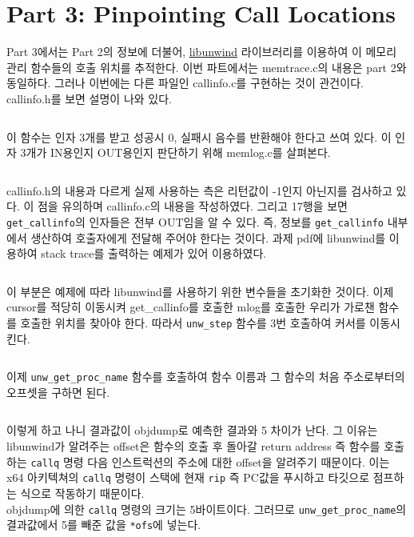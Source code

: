 \documentclass{report}
\begin{document}
\section{Part 3: Pinpointing Call Locations}
Part 3에서는 Part 2의 정보에 더불어, \href{https://github.com/libunwind/libunwind}{libunwind} 라이브러리를 이용하여 이 메모리 관리 함수들의 호출 위치를 추적한다. 이번 파트에서는 memtrace.c의 내용은 part 2와 동일하다. 그러나 이번에는 다른 파일인 callinfo.c를 구현하는 것이 관건이다.
\\
callinfo.h를 보면 설명이 나와 있다.
\inputminted[firstline=7,lastline=17, linenos]{C}{../handout/part3/callinfo.h}
이 함수는 인자 3개를 받고 성공시 0, 실패시 음수를 반환해야 한다고 쓰여 있다. 이 인자 3개가 IN용인지 OUT용인지 판단하기 위해 memlog.c를 살펴본다.
\inputminted[firstline=17,lastline=21, linenos]{C}{2019-13674.224747/utils/memlog.c}
callinfo.h의 내용과 다르게 실제 사용하는 측은 리턴값이 -1인지 아닌지를 검사하고 있다. 이 점을 유의하며 callinfo.c의 내용을 작성하였다. 그리고 17행을 보면 \lstinline{get_callinfo}의 인자들은 전부 OUT임을 알 수 있다. 즉, 정보를 \lstinline{get_callinfo} 내부에서 생산하여 호출자에게 전달해 주어야 한다는 것이다.
과제 pdf에 libunwind를 이용하여 stack trace를 출력하는 예제가 있어 이용하였다.

\inputminted[firstline=1, lastline=18,linenos]{C}{2019-13674.224747/part3/callinfo.c}
이 부분은 예제에 따라 libunwind를 사용하기 위한 변수들을 초기화한 것이다. 이제 cursor를 적당히 이동시켜 get\_callinfo를 호출한 mlog를 호출한 우리가 가로챈 함수를 호출한 위치를 찾아야 한다. 따라서 \lstinline{unw_step} 함수를 3번 호출하여 커서를 이동시킨다.
\inputminted[firstline=19, lastline=30,linenos]{C}{2019-13674.224747/part3/callinfo.c}
이제 \lstinline{unw_get_proc_name} 함수를 호출하여 함수 이름과 그 함수의 처음 주소로부터의 오프셋을 구하면 된다.
\inputminted[firstline=34, lastline=36,linenos]{C}{2019-13674.224747/part3/callinfo.c}
이렇게 하고 나니 결과값이 objdump로 예측한 결과와 5 차이가 난다. 그 이유는 libunwind가 알려주는 offset은 함수의 호출 후 돌아갈 return address 즉 함수를 호출하는 \lstinline{callq} 명령 다음 인스트럭션의 주소에 대한 offset을 알려주기 때문이다. 이는 x64 아키텍쳐의 \lstinline{callq} 명령이 스택에 현재 \lstinline{rip} 즉 PC값을 푸시하고 타깃으로 점프하는 식으로 작동하기 때문이다.
\\
objdump에 의한 \lstinline{callq} 명령의 크기는 5바이트이다. 그러므로 \lstinline{unw_get_proc_name}의 결과값에서 5를 빼준 값을 \lstinline{*ofs}에 넣는다.
\inputminted[firstline=37, lastline=40,linenos]{C}{2019-13674.224747/part3/callinfo.c}
\end{document}
